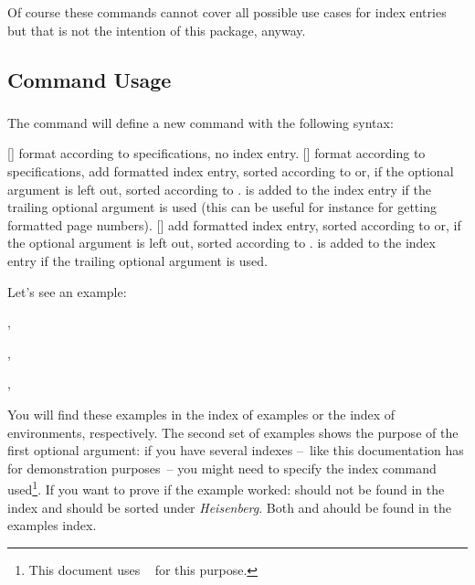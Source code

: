 \documentclass[load-preamble,add-index,scrartcl={DIV10}]{cnltx-doc}
\begin{document}
Of course these commands cannot cover all possible use cases for index entries
but that is not the intention of this package, anyway.

\subsection{Command Usage}\label{sec:command:usage}
\subsubsection{}\label{sec:command:usage:newidxcmd}
The command  will define
a new command  with the following syntax:
\begin{commands}
  [\sarg{}]
    format  according to specifications, no index entry.
  []
    format  according to specifications, add formatted index
    entry, sorted according to  or, if the optional argument
    is left out, sorted according to .   is added to
    the index entry if the trailing optional argument is used (this can be
    useful for instance for getting formatted page numbers).
  []
    add formatted index entry, sorted according to  or, if the
    optional argument is left out, sorted according to .
     is added to the index entry if the trailing optional
    argument is used.
\end{commands}

Let's see an example:
\begin{example}
  , 
  
  , 
 
  , 
\end{example}
You will find these examples in the index of examples or the index of
environments, respectively.  The second set of examples shows the purpose of
the first optional argument: if you have several indexes --~like this
documentation has for demonstration purposes~-- you might need to specify the
index command used\footnote{This document uses
  ~\cite{pkg:imakeidx} for this purpose.}.  If you want to prove
if the example worked:  should not be found in the
index and  should be sorted under
\emph{Heisenberg}.  Both  and  ahould be
found in the examples index.
\end{document}
